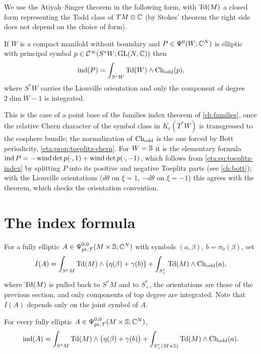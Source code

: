 We use the Atiyah--Singer theorem in the following form, with $\operatorname{Td}(M)$ a closed form
representing the Todd class of $TM\otimes\mathbb{C}$ (by Stokes' theorem the right side does
not depend on the choice of form).

\begin{theorem}\label{eta:thm:AS}
If $W$ is a compact manifold without boundary and $P\in\Psi^{0}(W;\mathbb{C}^N)$ is elliptic
with principal symbol $p\in\mathcal{C}^\infty(S^*W;\operatorname{GL}(N,\mathbb{C}))$ then
\[
\operatorname{ind}(P)=\int_{S^*W}\operatorname{Td}(W)\wedge\operatorname{Ch}_{\mathrm{odd}}(p),
\]
where $S^*W$ carries the Liouville orientation and only the component of degree $2\dim W-1$
is integrated.
\end{theorem}

This is the case of a point base of the families index theorem of \cref{ch:families},
once the relative Chern character of the symbol class in $K_c(T^*W)$ is transgressed to
the cosphere bundle; the normalization of $\operatorname{Ch}_{\mathrm{odd}}$ is the one forced by Bott
periodicity, \cref{eta:prop:toeplitz-chern}. For $W=\mathbb{S}$ it is the elementary formula
$\operatorname{ind} P=-\operatorname{wind}\det p(\cdot,1)+\operatorname{wind}\det p(\cdot,-1)$, which follows from
\eqref{eta:eq:toeplitz-index} by splitting $P$ into its positive and negative Toeplitz
parts (see \cref{ch:bott}); with the Liouville orientations ($d\theta$ on $\xi=1$,
$-d\theta$ on $\xi=-1$) this agrees with the theorem, which checks the orientation
convention.

\section{The index formula}\label{eta:sec:index}

For a fully elliptic $A\in\Psi^{0,0}_{\mathrm{pt},\mathcal{T}}(M\times\mathbb{S};\mathbb{C}^N)$ with symbols
$(a,\beta)$, $b=\sigma_0(\beta)$, set
\begin{equation}\label{eta:eq:I}
I(A)=\int_{S^*M}\operatorname{Td}(M)\wedge\bigl(\eta(\beta)+\gamma(b)\bigr)
+\int_{S^*_+}\operatorname{Td}(M)\wedge\operatorname{Ch}_{\mathrm{odd}}(a),
\end{equation}
where $\operatorname{Td}(M)$ is pulled back to $S^*M$ and to $S^*_+$, the orientations are those of the
previous section, and only components of top degree are integrated. Note that $I(A)$
depends only on the joint symbol of $A$.

\begin{theorem}\label{eta:thm:index}
For every fully elliptic $A\in\Psi^{0,0}_{\mathrm{pt},\mathcal{T}}(M\times\mathbb{S};\mathbb{C}^N)$,
\[
\operatorname{ind}(A)=\int_{S^*M}\operatorname{Td}(M)\wedge\bigl(\eta(\beta)+\gamma(b)\bigr)
+\int_{S^*_+(M\times\mathbb{S})}\operatorname{Td}(M)\wedge\operatorname{Ch}_{\mathrm{odd}}(a).
\]
\end{theorem}

